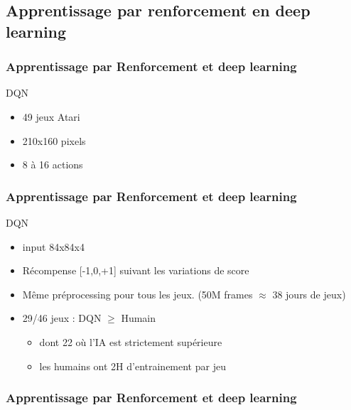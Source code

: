 \subsection{Apprentissage par renforcement en deep learning}



\begin{frame}
  \frametitle{Apprentissage par Renforcement et deep learning}
  DQN
  \begin{itemize}
  \item 49 jeux Atari
  \item 210x160 pixels
  \item 8 à 16 actions
  \end{itemize}
\end{frame}

\begin{frame}
  \frametitle{Apprentissage par Renforcement et deep learning}
  DQN
  \begin{itemize}
  \item input 84x84x4
  \item Récompense [-1,0,+1] suivant les variations de score
  \item Même préprocessing pour tous les jeux. (50M frames $\approx$ 38 jours de jeux)
  \item 29/46 jeux : DQN $\geq$ Humain
    \begin{itemize}
    \item dont 22 où l'IA est strictement supérieure
    \item les humains ont 2H d'entrainement par jeu
    \end{itemize}
  \end{itemize}
\end{frame}

\begin{frame}
  \frametitle{Apprentissage par Renforcement et deep learning}
  \href{https://www.youtube.com/watch?v=lcVg9hVya-c}{}
\end{frame}

